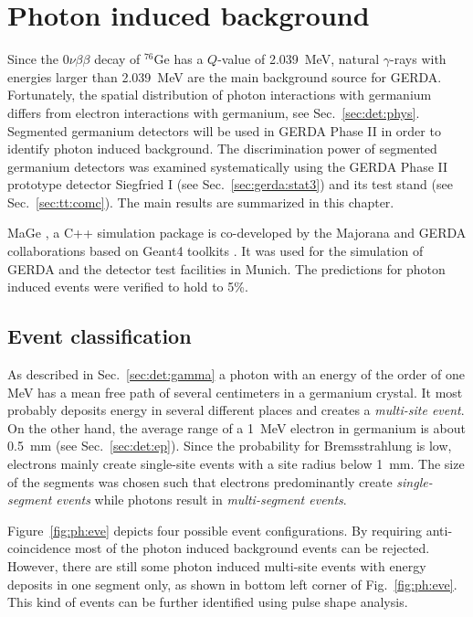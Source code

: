 \chapter{Photon induced background}
\label{cha:photon}
Since the $0\nu\beta\beta$ decay of $^{76}$Ge has a $Q$-value of 2.039~MeV, natural $\gamma$-rays with energies larger than 2.039~MeV are the main background source for GERDA. Fortunately, the spatial distribution of photon interactions with germanium differs from electron interactions with germanium, see Sec.~\ref{sec:det:phys}. Segmented germanium detectors will be used in GERDA Phase II in order to identify photon induced background. The discrimination power of segmented germanium detectors was examined systematically \cite{Pid07} using the GERDA Phase II prototype detector Siegfried I (see Sec.~\ref{sec:gerda:stat3}) and its test stand (see Sec.~\ref{sec:tt:comc}). The main results are summarized in this chapter. 

MaGe \cite{Mag08}, a C++ simulation package is co-developed by the Majorana and GERDA collaborations based on Geant4 toolkits \cite{Gea03,Gea06}. It was used for the simulation of GERDA and the detector test facilities in Munich. The predictions for photon induced events were verified to hold to 5\%.

\section{Event classification}
\label{sec:ph:eve}
As described in Sec.~\ref{sec:det:gamma} a photon with an energy of the order of one MeV has a mean free path of several centimeters in a germanium crystal. It most probably deposits energy in several different places and creates a \emph{multi-site event}. On the other hand, the average range of a 1~MeV electron in germanium is about 0.5~mm (see Sec.~\ref{sec:det:ep}). Since the probability for Bremsstrahlung is low, electrons mainly create single-site events with a site radius below 1~mm. The size of the segments was chosen such that electrons predominantly create \emph{single-segment events} while photons result in \emph{multi-segment events}.

Figure~\ref{fig:ph:eve} depicts four possible event configurations. By requiring anti-coincidence most of the photon induced background events can be rejected. However, there are still some photon induced multi-site events with energy deposits in one segment only, as shown in bottom left corner of Fig.~\ref{fig:ph:eve}. This kind of events can be further identified using pulse shape analysis. 

